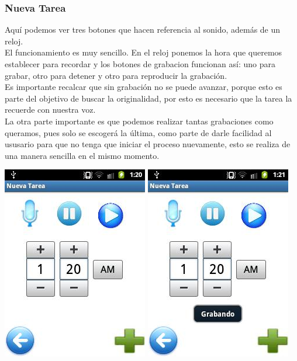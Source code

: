 \documentclass[10pt]{article}
\begin{document}
{\begin{flushleft}
\newpage
\subsubsection{Nueva Tarea}
Aqu\'i podemos ver tres botones que hacen referencia al sonido, adem\'as de un reloj.\\
El funcionamiento es muy sencillo. En el reloj ponemos la hora que queremos establecer para recordar y los botones de grabacion funcionan así: uno para grabar, otro para detener y otro para reproducir la grabaci\'on.\\
Es importante recalcar que sin grabaci\'on no se puede avanzar, porque esto es parte del objetivo de buscar la originalidad, por esto es necesario que la tarea la recuerde con nuestra voz.\\
La otra parte importante es que podemos realizar tantas grabaciones como queramos, pues solo se escoger\'a la \'ultima, como parte de darle facilidad al ususario para que no tenga que iniciar el proceso nuevamente, esto se realiza de una manera sencilla en el mismo momento.\\

\begin{center}
\vspace{0.4in}
\includegraphics[scale=0.8]{NuevaTarea1.jpg}
\hspace{0.4in}\includegraphics[scale=0.8]{NuevaTarea2.jpg}
\end{center}



\end{flushleft}}
\end{document}
